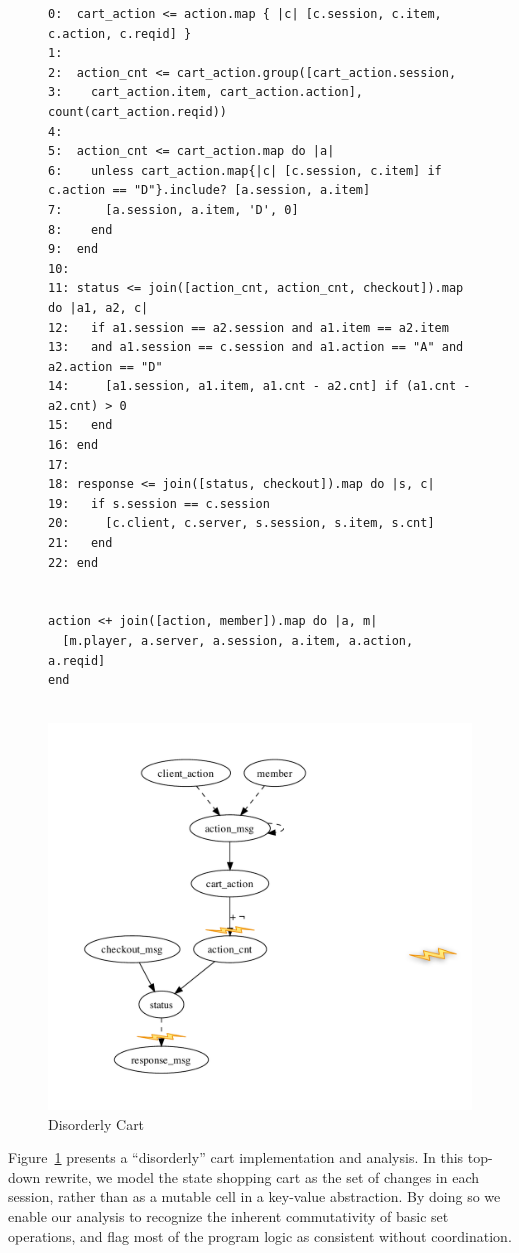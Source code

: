 \begin{figure}[t]
\begin{tiny}
\begin{verbatim}
0:  cart_action <= action.map { |c| [c.session, c.item, c.action, c.reqid] }
1:
2:  action_cnt <= cart_action.group([cart_action.session, 
3:    cart_action.item, cart_action.action], count(cart_action.reqid))
4:
5:  action_cnt <= cart_action.map do |a| 
6:    unless cart_action.map{|c| [c.session, c.item] if c.action == "D"}.include? [a.session, a.item] 
7:      [a.session, a.item, 'D', 0]
8:    end 
9:  end
10: 
11: status <= join([action_cnt, action_cnt, checkout]).map do |a1, a2, c| 
12:   if a1.session == a2.session and a1.item == a2.item 
13:   and a1.session == c.session and a1.action == "A" and a2.action == "D"
14:     [a1.session, a1.item, a1.cnt - a2.cnt] if (a1.cnt - a2.cnt) > 0
15:   end
16: end
17:
18: response <= join([status, checkout]).map do |s, c| 
19:   if s.session == c.session
20:     [c.client, c.server, s.session, s.item, s.cnt]
21:   end
22: end


action <+ join([action, member]).map do |a, m|
  [m.player, a.server, a.session, a.item, a.action, a.reqid]
end


\end{verbatim}
\end{tiny}

\centering
\includegraphics[width=0.7\linewidth]{fig/disorderly.pdf}
\caption{Disorderly Cart}
\label{fig:pdg-disorderly}
\end{figure}


Figure~\ref{fig:pdg-disorderly} presents a ``disorderly'' cart implementation
and analysis.  In this top-down rewrite, we model the state shopping cart 
as the set of changes in each session, rather than as a mutable cell in a
key-value abstraction.  By doing so we enable our analysis to recognize the
inherent commutativity of basic set operations, and flag most of the 
program logic as consistent without coordination.

